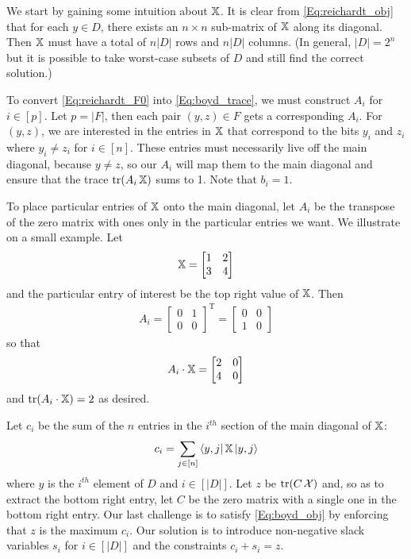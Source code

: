 We start by gaining some intuition about $\operatorname{\mathbb{X}}$.
It is clear from \cref{Eq:reichardt_obj} that for 
each $y \in D$, there exists an $n \times n$ sub-matrix of $\operatorname{\mathbb{X}}$ along its diagonal.
Then $\operatorname{\mathbb{X}}$ must have a total of $n|D|$ rows and $n|D|$ columns.
(In general, $|D| = 2^n$ but it is possible to take 
worst-case subsets of $D$ and still find the correct solution.)

To convert \cref{Eq:reichardt_F0} into \cref{Eq:boyd_trace},
we must construct $A_i$ for $i \in [p]$.
Let $p = |F|$, then each pair $(y,z) \in F$
gets a corresponding $A_i$.
For $(y,z)$, we are interested in the entries
in $\operatorname{\mathbb{X}}$ that correspond to the bits $y_i$ and $z_i$
where $y_i \neq z_i$ for $i \in [n]$.
These entries must necessarily live off the main diagonal,
because $y\neq z$,
so our $A_i$ will map them to the main diagonal 
and ensure that the trace $\operatorname{\text{tr}}(A_i \operatorname{\mathbb{X}})$ sums to 1.
Note that $b_i = 1$.

To place particular entries of $\operatorname{\mathbb{X}}$ onto the main diagonal,
let $A_i$ be the transpose of the zero matrix with
ones only in the particular entries we want.
We illustrate on a small example.
Let
\begin{align}
    \operatorname{\mathbb{X}} = \left[ \begin{matrix} 1 & 2 \\ 3 & 4 \end{matrix} \right] \nonumber
\end{align}
and the particular entry of interest be the top right value of $\operatorname{\mathbb{X}}$.
Then
\begin{align}
    A_i = \left[ \begin{matrix} 0 & 1 \\ 0 & 0 \end{matrix} \right]^\textrm{T} \nonumber
    = \left[ \begin{matrix} 0 & 0 \\ 1 & 0 \end{matrix} \right] \nonumber
\end{align}
so that
\begin{align}
    A_i \cdot \operatorname{\mathbb{X}} = \left[ \begin{matrix} 2 & 0 \\ 4 & 0 \end{matrix} \right] \nonumber
\end{align}
and $\operatorname{\text{tr}}(A_i \cdot \operatorname{\mathbb{X}}) = 2$ as desired.

Let $c_i$ be the sum of the $n$ entries
in the $i^{th}$ section of the main diagonal of $\operatorname{\mathbb{X}}$:
\begin{align}
    c_i = \sum_{j \in [n]} \bra{y,j}\operatorname{\mathbb{X}}\ket{y,j}
    \nonumber
\end{align} 
where $y$ is the $i^{th}$ element of $D$ and
$i \in [|D|]$.
Let $z$ be $\operatorname{\text{tr}}(C\operatorname{\mathcal{X}})$ and, so as to extract the bottom right entry,
let $C$ be the zero matrix with a single one in the bottom right entry.
Our last challenge is to satisfy \cref{Eq:boyd_obj}
by enforcing that $z$ is the maximum $c_i$.
Our solution is to introduce non-negative slack variables
$s_i$ for $i \in [|D|]$ and the constraints
$c_i + s_i = z$.

